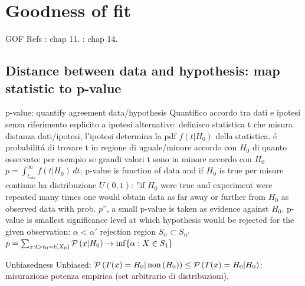 \documentclass[asd-beamer.tex]{subfiles}%
\begin{document}
\section{Goodness of fit}

\begin{wordonframe}{GOF Refs}
\cite{james2006statistical}: chap 11. \cite{lehmann2006testing}: chap 14.

\end{wordonframe}

\subsection{Distance between data and hypothesis: map statistic to p-value}

\begin{frame}{p-value: quantify agreement data/hypothesis}
Quantifico accordo tra dati e ipotesi senza riferimento esplicito a ipotesi alternative: definisco statistica t che misura distanza dati/ipotesi, l'ipotesi determina la pdf $f(t|H_0)$ della statistica.  \'e probabilit\'a di trovare t in regione di uguale/minore accordo con $H_0$ di quanto osservato: per esempio se grandi valori t sono in minore accordo con $H_0$ $p=\int_{t_{obs}}^{\infty}f(t|H_0)\,dt$; p-value is function of data and if $H_0$ is true per misure continue ha distribuzione $U(0,1)$: ''if $H_0$ were true and experiment were repeated many times one would obtain data as far away or further from $H_0$ as observed data with prob. $p$'', a small p-value is taken as evidence against $H_0$.
p-value is smallest significance level at which hypothesis would be rejected for the given observation: $\alpha<\alpha'$ rejection region $S_{\alpha}\subset S_{\alpha'}$ $p=\sum_{x:t>t_0=t(X_0)}\operatorname{\mathcal{P}}{(x|H_0)}\to\inf\{\alpha: X\in S_1\}$
\begin{block}{Unbiasedness}
Unbiased: $\operatorname{\mathcal{P}}{(T(x)=H_0|\operatorname{non}{(H_0)})}\leq\operatorname{\mathcal{P}}{(T(x)=H_0|H_0)}$: misurazione potenza empirica (set arbitrario di distribuzioni).
\end{block}
\end{frame}
\end{document}
